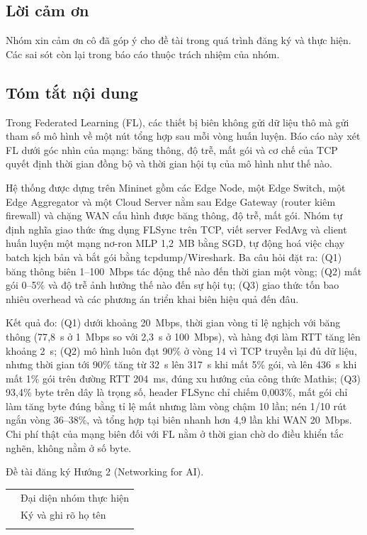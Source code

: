 \thispagestyle{empty}

\subsection*{\centering Lời cảm ơn}
Nhóm xin cảm ơn cô \theadvisor{} đã góp ý cho đề tài trong quá trình đăng ký và thực hiện. Các sai sót còn lại trong báo cáo thuộc trách nhiệm của nhóm.

\subsection*{\centering Tóm tắt nội dung}
Trong Federated Learning (FL), các thiết bị biên không gửi dữ liệu thô mà gửi tham số mô hình về một nút tổng hợp sau mỗi vòng huấn luyện. Báo cáo này xét FL dưới góc nhìn của mạng: băng thông, độ trễ, mất gói và cơ chế của TCP quyết định thời gian đồng bộ và thời gian hội tụ của mô hình như thế nào.

Hệ thống được dựng trên Mininet gồm các Edge Node, một Edge Switch, một Edge Aggregator và một Cloud Server nằm sau Edge Gateway (router kiêm firewall) và chặng WAN cấu hình được băng thông, độ trễ, mất gói. Nhóm tự định nghĩa giao thức ứng dụng FLSync trên TCP, viết server FedAvg và client huấn luyện một mạng nơ-ron MLP 1{,}2~MB bằng SGD, tự động hoá việc chạy batch kịch bản và bắt gói bằng tcpdump/Wireshark. Ba câu hỏi đặt ra: (Q1) băng thông biên 1--100~Mbps tác động thế nào đến thời gian một vòng; (Q2) mất gói 0--5\% và độ trễ ảnh hưởng thế nào đến sự hội tụ; (Q3) giao thức tốn bao nhiêu overhead và các phương án triển khai biên hiệu quả đến đâu.

Kết quả đo: (Q1) dưới khoảng 20~Mbps, thời gian vòng tỉ lệ nghịch với băng thông (77{,}8~s ở 1~Mbps so với 2{,}3~s ở 100~Mbps), và hàng đợi làm RTT tăng lên khoảng 2~s; (Q2) mô hình luôn đạt 90\% ở vòng 14 vì TCP truyền lại đủ dữ liệu, nhưng thời gian tới 90\% tăng từ 32~s lên 317~s khi mất 5\% gói, và lên 436~s khi mất 1\% gói trên đường RTT 204~ms, đúng xu hướng của công thức Mathis; (Q3) 93{,}4\% byte trên dây là trọng số, header FLSync chỉ chiếm 0{,}003\%, mất gói chỉ làm tăng byte đúng bằng tỉ lệ mất nhưng làm vòng chậm 10 lần; nén 1/10 rút ngắn vòng 36--38\%, và tổng hợp tại biên nhanh hơn 4{,}9 lần khi WAN 20~Mbps. Chi phí thật của mạng biên đối với FL nằm ở thời gian chờ do điều khiển tắc nghẽn, không nằm ở số byte.

Đề tài đăng ký Hướng 2 (Networking for AI).

\vfill
\begin{tabularx}{\textwidth}{>{\centering\arraybackslash}X>{\centering\arraybackslash}X}
    \centering
    & Đại diện nhóm thực hiện \\
    \centering
    &\fontsize{10pt}{0}\selectfont Ký và ghi rõ họ tên \\
    \centering
\end{tabularx}

\cleardoublepage
